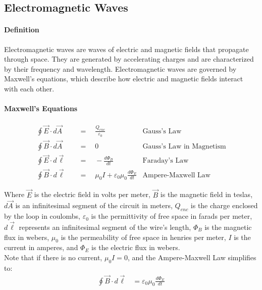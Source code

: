 \subsection{Electromagnetic Waves}
\hrulefill

\paragraph*{Definition}
Electromagnetic waves are waves of electric and magnetic fields that propagate through space. They are generated by accelerating charges 
and are characterized by their frequency and wavelength. Electromagnetic waves are governed by Maxwell's equations, which describe how electric
and magnetic fields interact with each other.

\paragraph*{Maxwell's Equations}

\begin{align*}
    \oint \vec{E} \cdot d\vec{A} \quad &= \quad \frac{Q_{enc}}{\varepsilon_0} &\text{Gauss's Law}\\
    \oint \vec{B} \cdot d\vec{A} \quad &= \quad 0 &\text{Gauss's Law in Magnetism}\\
    \oint \vec{E} \cdot d\vec{\ell} \quad &= \quad -\frac{d\Phi_B}{dt} &\text{Faraday's Law}\\
    \oint \vec{B} \cdot d\vec{\ell} \quad &= \quad \mu_0 I + \varepsilon_0\mu_0\frac{d\Phi_E}{dt} &\text{Ampere-Maxwell Law}
\end{align*}

Where $\vec{E}$ is the electric field in volts per meter, $\vec{B}$ is the magnetic field in teslas, $d\vec{A}$ is an infinitesimal 
segment of the circuit in meters, $Q_{enc}$ is the charge enclosed by the loop in coulombs, $\varepsilon_0$ is the permittivity of free 
space in farads per meter, $d\vec{\ell}$ represents an infinitesimal segment of the wire's length, $\Phi_B$ is the magnetic flux in webers, 
$\mu_0$ is the permeability of free space in henries per meter, $I$ is the current in amperes, and $\Phi_E$ is the electric flux in webers.\\

Note that if there is no current, $\mu_0 I = 0$, and the Ampere-Maxwell Law simplifies to:
\begin{align*}
    \oint \vec{B} \cdot d\vec{\ell} &= \varepsilon_0\mu_0\frac{d\Phi_E}{dt}
\end{align*}

